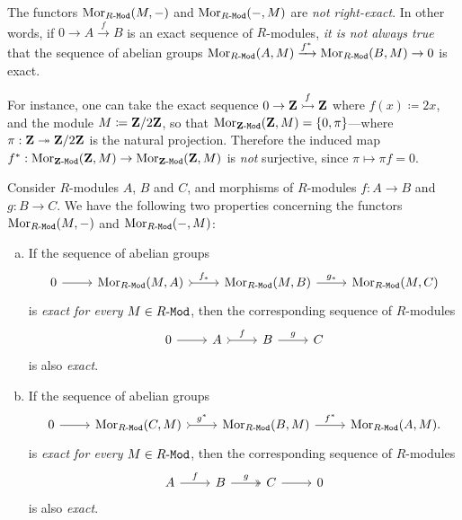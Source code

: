 \begin{remark}
\label{rem:not-right-exact}
The functors \(\operatorname{Mor}_{{R\text{-}\texttt{Mod}}}(M, -)\) and \(\operatorname{Mor}_{{R\text{-}\texttt{Mod}}}(-, M)\) are \emph{not
  right-exact}. In other words, if \(0 \to A \xrightarrow f B\) is an exact
sequence of \(R\)-modules, \emph{it is not always true} that the sequence of
abelian groups
\(\operatorname{Mor}_{{R\text{-}\texttt{Mod}}}(A, M) \xrightarrow {f^{*}} \operatorname{Mor}_{{R\text{-}\texttt{Mod}}}(B, M) \to 0\) is exact.

For instance, one can take the exact sequence \(0 \to \mathbf{Z} \overset f {\rightarrowtail} \mathbf{Z}\)
where \(f(x) \coloneq 2 x\), and the module \(M \coloneq \mathbf{Z}/2\mathbf{Z}\), so that
\(\operatorname{Mor}_{{\mathbf{Z}\text{-}\texttt{Mod}}}(\mathbf{Z}, M) = \{0, \pi\}\)---where \(\pi: \mathbf{Z} \twoheadrightarrow \mathbf{Z}/2\mathbf{Z}\) is the
natural projection. Therefore the induced map
\(f^{*}: \operatorname{Mor}_{{\mathbf{Z}\text{-}\texttt{Mod}}}(\mathbf{Z}, M) \to \operatorname{Mor}_{{\mathbf{Z}\text{-}\texttt{Mod}}}(\mathbf{Z}, M)\) is \emph{not}
surjective, since \(\pi \mapsto \pi f = 0\).
\end{remark}

\begin{proposition}
\label{prop:hom-exact-then-sequence-exact}
Consider \(R\)-modules \(A\), \(B\) and \(C\), and morphisms of
\(R\)-modules \(f: A \to B\) and \(g: B \to C\). We have the following two
properties concerning the functors \(\operatorname{Mor}_{{R\text{-}\texttt{Mod}}}(M, -)\) and
\(\operatorname{Mor}_{{R\text{-}\texttt{Mod}}}(-, M)\):
\begin{enumerate}[(a)]\setlength\itemsep{0em}
\item If the sequence of abelian groups
  \[
  \begin{tikzcd}
  0 \ar[r] &\Hom_{\Mod{R}}(M, A) \ar[r, tail, "f_{*}"] &\Hom_{\Mod{R}}(M, B)
  \ar[r, "g_{*}"] &\Hom_{\Mod{R}}(M, C)
  \end{tikzcd}
  \]
  is \emph{exact for every} \(M \in {R\text{-}\texttt{Mod}}\), then the corresponding sequence
  of \(R\)-modules
  \[
  \begin{tikzcd}
  0 \ar[r] &A \ar[r, tail, "f"] &B \ar[r, "g"] &C
  \end{tikzcd}
  \]
  is also \emph{exact}.

\item If the sequence of abelian groups
  \[
  \begin{tikzcd}
  0 \ar[r] &\Hom_{\Mod{R}}(C, M) \ar[r, tail, "g^{*}"] &\Hom_{\Mod{R}}(B, M)
  \ar[r, "f^{*}"] &\Hom_{\Mod{R}}(A, M).
  \end{tikzcd}
  \]
  is \emph{exact for every} \(M \in {R\text{-}\texttt{Mod}}\), then the corresponding sequence
  of \(R\)-modules
  \[
  \begin{tikzcd}
  A \ar[r, "f"] &B \ar[r, two heads, "g"] &C \ar[r] &0
  \end{tikzcd}
  \]
  is also \emph{exact}.
\end{enumerate}
\end{proposition}

